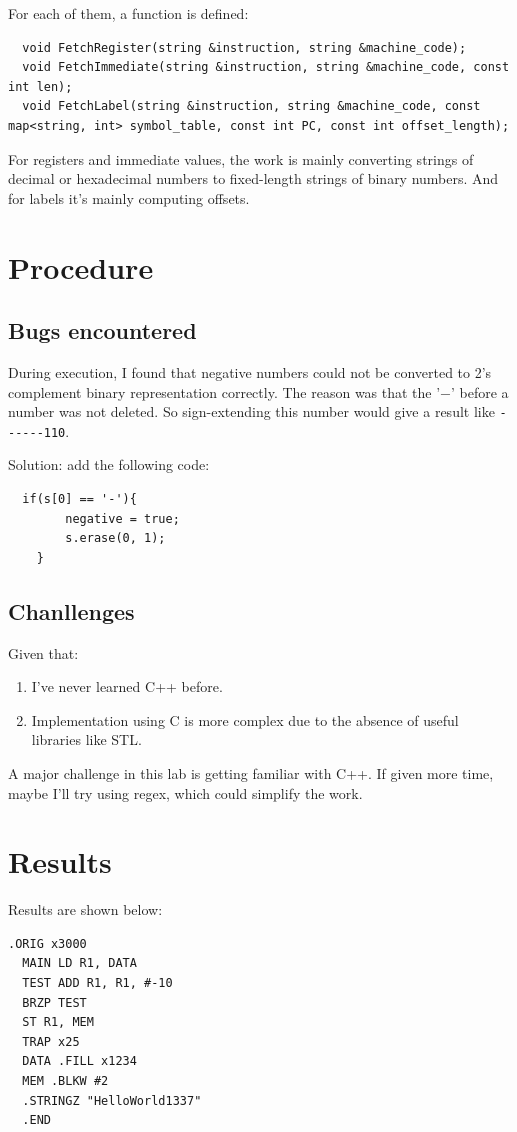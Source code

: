 \documentclass[UTF8]{ctexart}
\begin{document}
For each of them, a function is defined:
\begin{lstlisting}
  void FetchRegister(string &instruction, string &machine_code);
  void FetchImmediate(string &instruction, string &machine_code, const int len);
  void FetchLabel(string &instruction, string &machine_code, const map<string, int> symbol_table, const int PC, const int offset_length);
\end{lstlisting}

For registers and immediate values, the work is mainly converting strings of decimal or hexadecimal numbers to fixed-length strings of binary numbers. 
And for labels it's mainly computing offsets.

\section{Procedure}
\subsection{Bugs encountered}
During execution, I found that negative numbers could not be converted to 2's complement binary representation
correctly. The reason was that the '$-$' before a number was not deleted. So sign-extending this number would 
give a result like \lstinline{------110}.

Solution: add the following code:
\begin{lstlisting}
  if(s[0] == '-'){
        negative = true;
        s.erase(0, 1);
    }
\end{lstlisting}
\subsection{Chanllenges}
Given that: 
\begin{enumerate}
  \item I've never learned C++ before.
  \item Implementation using C is more complex due to the absence of useful libraries like STL.
\end{enumerate}

A major challenge in this lab is getting familiar with C++. If given more time, maybe I'll try using regex, which could simplify the work.

\section{Results}
Results are shown below:
\begin{lstlisting}[caption = test\_in.asm]
  .ORIG x3000
  MAIN LD R1, DATA
  TEST ADD R1, R1, #-10
  BRZP TEST
  ST R1, MEM
  TRAP x25
  DATA .FILL x1234
  MEM .BLKW #2
  .STRINGZ "HelloWorld1337"
  .END
\end{lstlisting}
\end{document}
